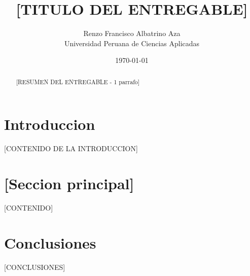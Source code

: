 \documentclass[12pt,a4paper]{article}
\title{[TITULO DEL ENTREGABLE]}
\author{Renzo Francisco Albatrino Aza \\ Universidad Peruana de Ciencias Aplicadas}
\date{\today}
\begin{document}
\maketitle

\begin{abstract}
[RESUMEN DEL ENTREGABLE - 1 parrafo]
\end{abstract}

\section{Introduccion}
[CONTENIDO DE LA INTRODUCCION]

\section{[Seccion principal]}
[CONTENIDO]



\section{Conclusiones}
[CONCLUSIONES]



\end{document}
